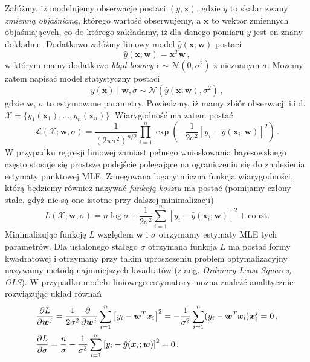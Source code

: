\documentclass{myclass}
\numberwithin{equation}{subsection}
\begin{document}
Załóżmy, iż modelujemy obserwacje postaci \((y, \bm{x})\), gdzie \(y\) to skalar zwany \emph{zmienną
objaśnianą}, którego wartość obserwujemy, a \(\bm{x}\) to wektor zmiennych objaśniających, co do
którego zakładamy, iż dla danego pomiaru \(y\) jest on znany dokładnie. Dodatkowo załóżmy liniowy
model \(\hat{y}(\bm{x};\bm{w})\) postaci
\begin{equation}
    \hat{y}(\bm{x};\bm{w}) = \bm{x}^T\bm{w}\,,
\end{equation}
w którym mamy dodatkowo \emph{błąd losowy} \(\epsilon \sim \mathcal{N}(0, \sigma^2)\) z nieznanym
\(\sigma\). Możemy zatem napisać model statystyczny postaci
\begin{equation}
    y(\bm{x}) \mid \bm{w}, \sigma \sim \mathcal{N}(\hat{y}(\bm{x}; \bm{w}), \sigma^2)\,,
\end{equation}
gdzie \(\bm{w}\), \(\sigma\) to estymowane parametry. Powiedzmy, iż mamy zbiór obserwacji i.i.d.
\(\mathcal{X} = \{y_1(\bm{x}_1), \ldots, y_n(\bm{x}_n)\}\). Wiarygodność ma zatem postać
\begin{equation}\boxed{
    \mathcal{L}(\mathcal{X} ; \bm{w}, \sigma) = \frac{1}{(2\pi\sigma^2)^{n/2}} \prod_{i=1}^n \exp\left(-\frac{1}{2\sigma^2}\left[y_i - \hat{y}(\bm{x}_i; \bm{w})\right]^2\right)\,.
}\end{equation}
W przypadku regresji liniowej zamiast pełnego wnioskowania bayesowskiego często stosuje się prostsze
podejście polegające na ograniczeniu się do znalezienia estymaty punktowej MLE. Zanegowana
logarytmiczna funkcja wiarygodności, którą będziemy również nazywać \emph{funkcją kosztu} ma postać
(pomijamy człony stałe, gdyż nie są one istotne przy dalszej minimalizacji)
\begin{equation}\boxed{
    L(\mathcal{X}; \bm{w}, \sigma) = n\log\sigma + \frac{1}{2\sigma^2}\sum_{i=1}^n \left[y_i - \hat{y}(\bm{x}_i; \bm{w})\right]^2 + \mathrm{const.}
}\end{equation}
Minimalizując funkcję \(L\) względem \(\bm{w}\) i \(\sigma\) otrzymamy estymaty MLE tych parametrów.
Dla ustalonego stałego \(\sigma\) otrzymana funkcja \(L\) ma postać formy kwadratowej i otrzymany
przy takim uproszczeniu problem optymalizacyjny nazywamy metodą najmniejszych kwadratów (z ang.
\textit{Ordinary Least Squares, OLS}). W przypadku modelu liniowego estymatory można znaleźć
analitycznie rozwiązując układ równań
\begin{equation}
    \begin{split}
        &\pdv{L}{\bm{w}^j} = \frac{1}{2\sigma^2}\pdv{~}{\bm{w}^j}\sum_{i=1}^n\left[y_i - \bm{w}^T\bm{x}_i\right]^2 = -\frac{1}{\sigma^2}\sum_{i=1}^n (y_i - \bm{w}^T\bm{x}_i)\bm{x}_i^j = 0\,,\\
        &\pdv{L}{\sigma} = \frac{n}{\sigma} - \frac{1}{\sigma^3}\sum_{i=1}^n \left[y_i - \hat{y}(\bm{x}_i; \bm{w})\right]^2 = 0\,.
    \end{split}
\end{equation}
\end{document}
